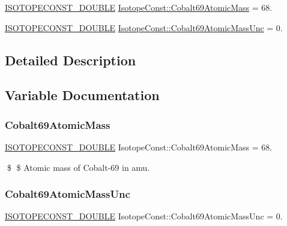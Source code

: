 \begin{DoxyCompactItemize}
\item 
\mbox{\hyperlink{group___isotope_const-_macros_ga8f45a7272ce02c0b4c65c44636ed719a}{I\+S\+O\+T\+O\+P\+E\+C\+O\+N\+S\+T\+\_\+\+D\+O\+U\+B\+LE}} \mbox{\hyperlink{group___isotope_const-_cobalt-_co69_gaec299a7da61ff79164eec53a0fb989fe}{Isotope\+Const\+::\+Cobalt69\+Atomic\+Mass}} = 68.
\item 
\mbox{\hyperlink{group___isotope_const-_macros_ga8f45a7272ce02c0b4c65c44636ed719a}{I\+S\+O\+T\+O\+P\+E\+C\+O\+N\+S\+T\+\_\+\+D\+O\+U\+B\+LE}} \mbox{\hyperlink{group___isotope_const-_cobalt-_co69_ga00a5139136b47db713dd05225e265d29}{Isotope\+Const\+::\+Cobalt69\+Atomic\+Mass\+Unc}} = 0.
\end{DoxyCompactItemize}


\subsection{Detailed Description}


\subsection{Variable Documentation}
\mbox{\label{group___isotope_const-_cobalt-_co69_gaec299a7da61ff79164eec53a0fb989fe}} 
\subsubsection{\texorpdfstring{Cobalt69\+Atomic\+Mass}{Cobalt69AtomicMass}}
{\footnotesize\ttfamily \mbox{\hyperlink{group___isotope_const-_macros_ga8f45a7272ce02c0b4c65c44636ed719a}{I\+S\+O\+T\+O\+P\+E\+C\+O\+N\+S\+T\+\_\+\+D\+O\+U\+B\+LE}} Isotope\+Const\+::\+Cobalt69\+Atomic\+Mass = 68.}

\$ \$ Atomic mass of Cobalt-\/69 in amu. \mbox{\label{group___isotope_const-_cobalt-_co69_ga00a5139136b47db713dd05225e265d29}} 
\subsubsection{\texorpdfstring{Cobalt69\+Atomic\+Mass\+Unc}{Cobalt69AtomicMassUnc}}
{\footnotesize\ttfamily \mbox{\hyperlink{group___isotope_const-_macros_ga8f45a7272ce02c0b4c65c44636ed719a}{I\+S\+O\+T\+O\+P\+E\+C\+O\+N\+S\+T\+\_\+\+D\+O\+U\+B\+LE}} Isotope\+Const\+::\+Cobalt69\+Atomic\+Mass\+Unc = 0.}

